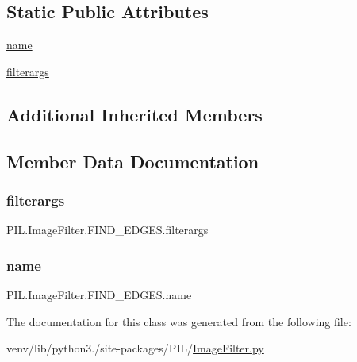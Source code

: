 \subsection*{Static Public Attributes}
\begin{DoxyCompactItemize}
\item 
\hyperlink{classPIL_1_1ImageFilter_1_1FIND__EDGES_a3756c7804a760592861ebc137089c993}{name}
\item 
\hyperlink{classPIL_1_1ImageFilter_1_1FIND__EDGES_a38970a37b8150bca082d6351860f886a}{filterargs}
\end{DoxyCompactItemize}
\subsection*{Additional Inherited Members}


\subsection{Member Data Documentation}
\mbox{\label{classPIL_1_1ImageFilter_1_1FIND__EDGES_a38970a37b8150bca082d6351860f886a}} 
\subsubsection{\texorpdfstring{filterargs}{filterargs}}
{\footnotesize\ttfamily P\+I\+L.\+Image\+Filter.\+F\+I\+N\+D\+\_\+\+E\+D\+G\+E\+S.\+filterargs\hspace{0.3cm}{\ttfamily [static]}}

\mbox{\label{classPIL_1_1ImageFilter_1_1FIND__EDGES_a3756c7804a760592861ebc137089c993}} 
\subsubsection{\texorpdfstring{name}{name}}
{\footnotesize\ttfamily P\+I\+L.\+Image\+Filter.\+F\+I\+N\+D\+\_\+\+E\+D\+G\+E\+S.\+name\hspace{0.3cm}{\ttfamily [static]}}



The documentation for this class was generated from the following file\+:\begin{DoxyCompactItemize}
\item 
venv/lib/python3./site-\/packages/\+P\+I\+L/\hyperlink{ImageFilter_8py}{Image\+Filter.\+py}\end{DoxyCompactItemize}
